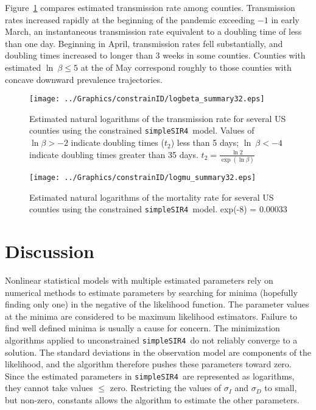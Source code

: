 \documentclass[12pt,letterpaper]{article}
\newcommand\help[1]{\color{Magenta}{\it #1 }\normalcolor}
\newcommand\SSm{{\tt simpleSIR4}}
\begin{document}
Figure~\ref{fig:xrates} compares estimated transmission rate among
counties.
Transmission rates increased rapidly at the beginning of the pandemic
exceeding  $-1$ in early March, an instantaneous transmission rate equivalent to a 
doubling time of less than one day.
Beginning in April, transmission rates fell substantially, and doubling times
increased to longer than 3 weeks in some counties.
Counties with estimated $\ln~ \beta \le 5$ at the of May
correspond roughly to those counties with concave downward prevalence
trajectories.


\begin{figure}
\begin{center}
\texttt{[image: ../Graphics/constrainID/logbeta\_summary32.eps]}\\
\end{center}
\caption{\label{fig:xrates}
Estimated natural logarithms of the transmission rate for several US counties using the
constrained \SSm\ model.
Values of $\ln \beta > -2$ indicate doubling times ($t_2$) less than 5 days;
$\ln~ \beta < -4$ indicate doubling times greater than 35 days.
$t_2 = \frac{\ln 2}{\exp(\ln \beta)}$
}
\end{figure}

\begin{figure}
\begin{center}
\texttt{[image: ../Graphics/constrainID/logmu\_summary32.eps]}\\
\end{center}
\caption{\label{fig:drates}
Estimated natural logarithms of the mortality rate for several US counties using the
constrained \SSm\ model.
exp(-8) = 0.00033
\help{Remove ToNY, Tompkins Co NY}
}
\end{figure}

\section*{Discussion}

Nonlinear statistical models with multiple estimated parameters rely
on numerical methods to estimate parameters by searching for minima
(hopefully finding only one) in the negative of the likelihood
function. The parameter values at the minima are considered to be
maximum likelihood estimators. Failure to find well defined minima is
usually a cause for concern. The minimization algorithms applied to
unconstrained \SSm\ do not reliably converge to a solution. The
standard deviations in the observation model are components of the
likelihood, and the algorithm therefore pushes these parameters toward zero.
Since the estimated parameters in \SSm\ are represented as logarithms,
they cannot take values $\le$ zero. Restricting the values of
$\sigma_I$ and $\sigma_D$ to small, but non-zero, constants allows the
algorithm to estimate the other parameters.
\end{document}

